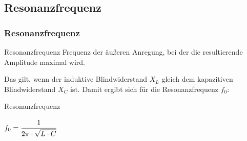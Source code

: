 \subsection*{Resonanz\-frequenz}
\begin{frame}
  \frametitle{Resonanzfrequenz}
  \begin{block}{Resonanzfrequenz}
    Frequenz der äußeren Anregung, bei der die resultierende Amplitude maximal wird.
  \end{block}

  Das gilt, wenn der induktive Blindwiderstand $X_L$ gleich dem kapazitiven Blindwiderstand $X_C$ ist. Damit ergibt sich für die Resonanzfrequenz $f_0$:
  \begin{block}{Resonanzfrequenz}
    \begin{center}
      $f_0 = \cfrac{1}{2\pi \cdot \sqrt{L \cdot C}}$
    \end{center}
  \end{block}
\end{frame}

